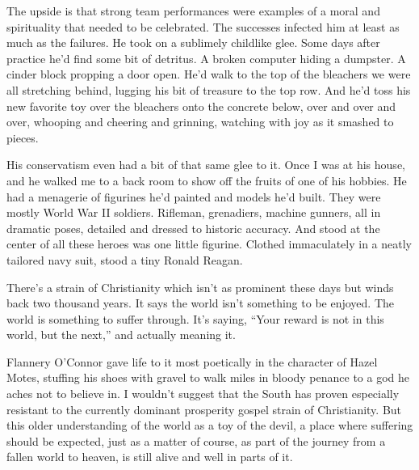 \documentclass[12pt, oneside]{memoir}
\begin{document}
The upside is that strong team performances were examples of a moral
and spirituality that needed to be celebrated.
The successes infected him at least as much as the failures.
He took on a sublimely childlike glee.
Some days after practice he'd find some bit of detritus.
A broken computer hiding a dumpster.
A cinder block propping a door open.
He'd walk to the top of the bleachers we were all stretching behind,
lugging his bit of treasure to the top row.
And he'd toss his new favorite toy over the bleachers onto the
concrete below, over and over and over, whooping and cheering and
grinning, watching with joy as it smashed to pieces.

His conservatism even had a bit of that same glee to it.
Once I was at his house, and he walked me to a back room to show off
the fruits of one of his hobbies.
He had a menagerie of figurines he'd painted and models he'd built.
They were mostly World War II soldiers.
Rifleman, grenadiers, machine gunners, all in dramatic poses, detailed
and dressed to historic accuracy.
And stood at the center of all these heroes was one little figurine.
Clothed immaculately in a neatly tailored navy suit, stood a
tiny Ronald Reagan.










There's a strain of Christianity which isn't as prominent these days
but winds back two thousand years.
It says the world isn't something to be enjoyed.
The world is something to suffer through.
It's saying, ``Your reward is not in this world, but the next,'' and
actually meaning it.

Flannery O'Connor gave life to it most poetically in the character of
Hazel Motes, stuffing his shoes with gravel to walk miles in bloody
penance to a god he aches not to believe in.
I wouldn't suggest that the South has proven especially resistant to the
currently dominant prosperity gospel strain of Christianity.
But this older understanding of the world as a toy of the devil, a
place where suffering should be expected, just as a matter of course,
as part of the journey from a fallen world to heaven, is still alive
and well in parts of it.
\end{document}
